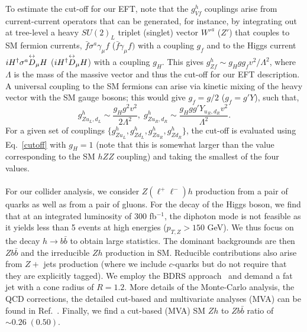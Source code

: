 To estimate  the cut-off for 
our EFT, note that the ${g}^h_{Vf}$ couplings arise from current-current operators that can be generated, for instance, 
by integrating out at tree-level a heavy $SU(2)_L$ triplet (singlet) vector $W'^a$ ($Z'$) that couples 
to SM fermion currents, $\bar{f} \sigma^a \gamma_\mu f$ ($\bar{f} \gamma_\mu f)$ with a coupling 
$g_f$ and to the Higgs current $i{H}^\dagger \sigma^a \overset{\text{\scriptsize$\leftrightarrow$}}{D}_\mu H$ ($i{H}^\dagger \overset{\text{\scriptsize$\leftrightarrow$}}{D}_\mu H$) 
with a coupling $g_H$. This gives ${g}^h_{Zf}\sim g_H g g_f v^2/\Lambda^2$,
where $\Lambda$ is the mass of the massive vector and thus the cut-off for our EFT description. A universal coupling to the SM fermions can arise  
via kinetic mixing of the heavy vector with the SM gauge bosons; this would give $g_f=g/2$ ($g_f=g' Y$), such that,
\begin{equation}
  \label{cutoff}
{g}^h_{Zu_L,d_L} \sim \frac{g_H g^2  v^2}{ 2\Lambda^2},\;
{g}^h_{Zu_R,d_R} \sim \frac{g_H g g' Y_{u_R,d_R} v^2}{\Lambda^2}.
\end{equation}
 For a given  set of couplings   $\{{g}^h_{Zu_L} ,{g}^h_{Zd_L} ,{g}^h_{Zu_R} ,{g}^h_{Zd_R} \}$, the cut-off is  evaluated using 
 Eq.~\ref{cutoff} with $g_H=1$ (note that this is somewhat larger than the value corresponding to the SM $hZZ$ coupling) and taking the smallest of the four values. \\ \\
 
                                                                                                                
For our collider analysis, we consider  $Z(\ell^+\ell^-)h$ production from a pair of quarks as well as from a 
pair of gluons.  For the decay of the Higgs boson,  we find that at an integrated luminosity of  300 fb$^{-1}$,  the diphoton mode is not feasible as it yields less than 5 events at high energies ($p_{T,Z}>150$ GeV). We thus focus on the decay $h\to b\bar b$ to obtain large statistics. The dominant backgrounds are then  
$Zb\bar{b}$ and the irreducible $Zh$ production in SM. Reducible contributions also arise from $Z+$ jets production (where we include $c$-quarks but do not require that they are explicitly tagged). We employ the BDRS 
approach~\cite{Butterworth:2008iy} and demand a fat jet with a cone radius of $R=1.2$. More details of the Monte-Carlo analysis, the QCD corrections, the detailed cut-based 
and multivariate analyses (MVA) can be found in Ref.~\cite{Banerjee:2018bio}. Finally, we find a cut-based (MVA) SM $Zh$ to $Zb\bar{b}$ ratio of $\sim 0.26 \; 
(0.50)$.

